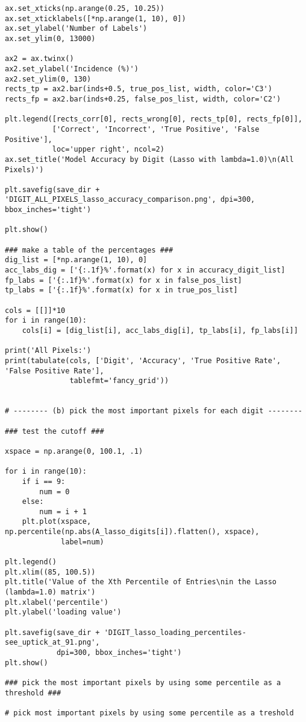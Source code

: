 \documentclass[10pt]{article}
\begin{document}
\begin{lstlisting}
ax.set_xticks(np.arange(0.25, 10.25))
ax.set_xticklabels([*np.arange(1, 10), 0])
ax.set_ylabel('Number of Labels')
ax.set_ylim(0, 13000)

ax2 = ax.twinx()
ax2.set_ylabel('Incidence (%)')
ax2.set_ylim(0, 130)
rects_tp = ax2.bar(inds+0.5, true_pos_list, width, color='C3')
rects_fp = ax2.bar(inds+0.25, false_pos_list, width, color='C2')

plt.legend([rects_corr[0], rects_wrong[0], rects_tp[0], rects_fp[0]],
           ['Correct', 'Incorrect', 'True Positive', 'False Positive'],
           loc='upper right', ncol=2)
ax.set_title('Model Accuracy by Digit (Lasso with lambda=1.0)\n(All Pixels)')

plt.savefig(save_dir + 'DIGIT_ALL_PIXELS_lasso_accuracy_comparison.png', dpi=300, bbox_inches='tight')

plt.show()

### make a table of the percentages ###
dig_list = [*np.arange(1, 10), 0]
acc_labs_dig = ['{:.1f}%'.format(x) for x in accuracy_digit_list]
fp_labs = ['{:.1f}%'.format(x) for x in false_pos_list]
tp_labs = ['{:.1f}%'.format(x) for x in true_pos_list]

cols = [[]]*10
for i in range(10):
    cols[i] = [dig_list[i], acc_labs_dig[i], tp_labs[i], fp_labs[i]]

print('All Pixels:')
print(tabulate(cols, ['Digit', 'Accuracy', 'True Positive Rate', 'False Positive Rate'],
               tablefmt='fancy_grid'))


# -------- (b) pick the most important pixels for each digit --------

### test the cutoff ###

xspace = np.arange(0, 100.1, .1)

for i in range(10):
    if i == 9:
        num = 0
    else:
        num = i + 1
    plt.plot(xspace, np.percentile(np.abs(A_lasso_digits[i]).flatten(), xspace),
             label=num)

plt.legend()    
plt.xlim((85, 100.5))
plt.title('Value of the Xth Percentile of Entries\nin the Lasso (lambda=1.0) matrix')
plt.xlabel('percentile')
plt.ylabel('loading value')

plt.savefig(save_dir + 'DIGIT_lasso_loading_percentiles-see_uptick_at_91.png',
            dpi=300, bbox_inches='tight')
plt.show()

### pick the most important pixels by using some percentile as a threshold ###

# pick most important pixels by using some percentile as a treshold


\end{lstlisting}
\end{document}
